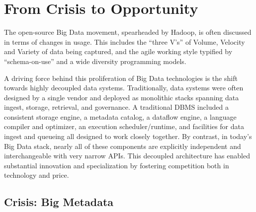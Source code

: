 \documentclass{sig-alternate}
\begin{document}
\section{From Crisis to Opportunity}
The open-source Big Data movement, spearheaded by Hadoop, is often discussed in terms of changes in usage. This includes the ``three V's'' of Volume, Velocity and Variety of data being captured, and the agile working style typified by ``schema-on-use'' and a wide diversity programming models.

A driving force behind this proliferation of Big Data technologies is the
shift towards highly decoupled data systems. 
Traditionally, data systems were often designed by a single vendor and deployed as monolithic stacks spanning data ingest, storage, retrieval, and governance.
A traditional DBMS included a consistent storage engine, a metadata catalog, a dataflow engine, a language compiler and optimizer, an execution scheduler/runtime, and facilities for data ingest and queueing all designed to work closely together.
By contrast, in today's Big Data stack, nearly all of these components are explicitly independent and interchangeable with very narrow APIs.
This decoupled architecture has enabled substantial innovation and specialization by fostering competition both in technology and price.

\subsection{Crisis: Big Metadata}
\end{document}

